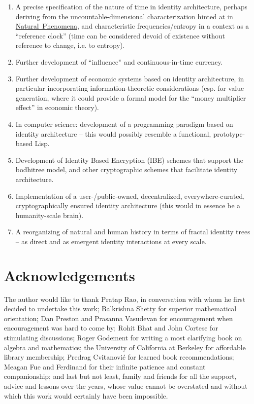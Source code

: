 \documentclass[pra,twocolumn,groupedaddress,10pt]{revtex4}
\theoremstyle{definition}
\begin{document}
\begin{enumerate}
	\item A precise specification of the nature of time in identity architecture, perhaps deriving from the uncountable-dimensional characterization hinted at in \hyperref[sec:natphe]{Natural~Phenomena}, and characteristic frequencies/entropy in a context as a ``reference clock'' (time can be considered devoid of existence without reference to change, i.e. to entropy).
	\item Further development of ``influence'' and continuous-in-time currency.
	\item Further development of economic systems based on identity architecture, in particular incorporating information-theoretic considerations (esp. for value generation, where it could provide a formal model for the ``money multiplier effect'' in economic theory).
	\item In computer science: development of a programming paradigm based on identity architecture -- this would possibly resemble a functional, prototype-based Lisp.
	\item Development of Identity Based Encryption (IBE) schemes that support the bodhitree model, and other cryptographic schemes that facilitate identity architecture.
	\item Implementation of a user-/public-owned, decentralized, everywhere-curated, cryptographically ensured identity architecture (this would in essence be a humanity-scale brain).
	\item A reorganizing of natural and human history in terms of fractal identity trees -- as direct and as emergent identity interactions at every scale.
\end{enumerate}

\section{Acknowledgements} \label{sec:acknowledgements}

The author would like to thank Pratap Rao, in conversation with whom he first decided to undertake this work; Balkrishna Shetty\cite{shetty} for superior mathematical orientation; Dan Preston and Prasanna Vasudevan for encouragement when encouragement was hard to come by; Rohit Bhat and John Cortese for stimulating discussions; Roger Godement for writing a most clarifying book\cite{godement} on algebra and mathematics; the University of California at Berkeley for affordable library membership; Predrag Cvitanovi\'{c} for learned book recommendations; Meagan Fue and Ferdinand for their infinite patience and constant companionship; and last but not least, family and friends for all the support, advice and lessons over the years, whose value cannot be overstated and without which this work would certainly have been impossible.
\end{document}
